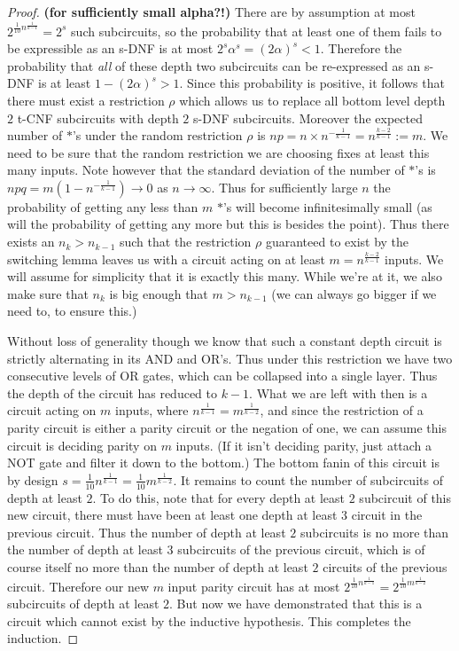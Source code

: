 \begin{proof}
\textbf{(for sufficiently small alpha?!)} There are by assumption at most $2^{\frac{1}{10}n^{\frac{1}{k-1}}} = 2^s$ such subcircuits, so the probability that at least one of them fails to be expressible as an s-DNF is at most $2^s\alpha^s = (2\alpha)^s < 1$. Therefore the probability that \emph{all} of these depth two subcircuits can be re-expressed as an s-DNF is at least $1-(2\alpha)^s > 1$. Since this probability is positive, it follows that there must exist a restriction $\rho$ which allows us to replace all bottom level depth $2$ t-CNF subcircuits with depth $2$ s-DNF subcircuits.
Moreover the expected number of $*$'s under the random restriction $\rho$ is $np = n\times n^{-\frac{1}{k-1}} = n^{\frac{k-2}{k-1}} :=m$. We need to be sure that the random restriction we are choosing fixes at least this many inputs. Note however that the standard deviation of the number of $*$'s is $npq = m(1-n^{-\frac{1}{k-1}}) \to 0$ as $n \to \infty$. Thus for sufficiently large $n$ the probability of getting any less than $m$ $*$'s will become infinitesimally small (as will the probability of getting any more but this is besides the point). Thus there exists an $n_k > n_{k-1}$ such that the restriction $\rho$ guaranteed to exist by the switching lemma leaves us with a circuit acting on at least $m = n^{\frac{k-2}{k-1}}$ inputs. We will assume for simplicity that it is exactly this many. While we're at it, we also make sure that $n_k$ is big enough that $m > n_{k-1}$ (we can always go bigger if we need to, to ensure this.) \par 
Without loss of generality though we know that such a constant depth circuit is strictly alternating in its AND and OR's. Thus under this restriction we have two consecutive levels of OR gates, which can be collapsed into a single layer. Thus the depth of the circuit has reduced to $k-1$. What we are left with then is a circuit acting on $m$ inputs, where $n^{\frac{1}{k-1}} = m^{\frac{1}{k-2}}$, and since the restriction of a parity circuit is either a parity circuit or the negation of one, we can assume this circuit is deciding parity on $m$ inputs. (If it isn't deciding parity, just attach a NOT gate and filter it down to the bottom.) The bottom fanin of this circuit is by design $s = \frac{1}{10}n^{\frac{1}{k-1}} = \frac{1}{10}m^{\frac{1}{k-2}}$. It remains to count the number of subcircuits of depth at least $2$. To do this, note that for every depth at least $2$ subcircuit of this new circuit, there must have been at least one depth at least $3$ circuit in the previous circuit. Thus the number of depth at least $2$ subcircuits is no more than the number of depth at least $3$ subcircuits of the previous circuit, which is of course itself no more than the number of depth at least $2$ circuits of the previous circuit. Therefore our new $m$ input parity circuit has at most $2^{\frac{1}{10}n^{\frac{1}{k-1}}} = 2^{\frac{1}{10}m^{\frac{1}{k-2}}}$ subcircuits of depth at least $2$. But now we have demonstrated that this is a circuit which cannot exist by the inductive hypothesis. This completes the induction. 
\end{proof}
